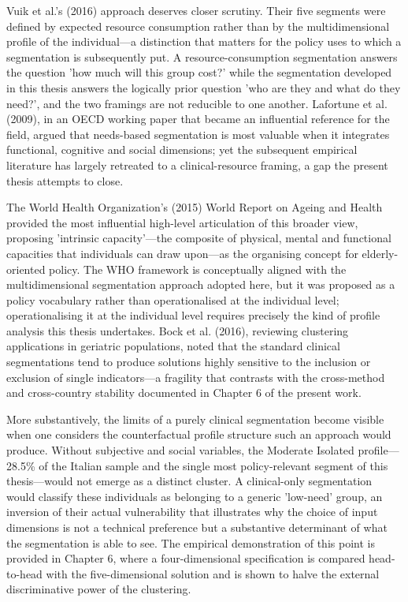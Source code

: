 Vuik et al.'s (2016) approach deserves closer scrutiny. Their five segments were defined by expected resource consumption rather than by the multidimensional profile of the individual---a distinction that matters for the policy uses to which a segmentation is subsequently put. A resource-consumption segmentation answers the question 'how much will this group cost?' while the segmentation developed in this thesis answers the logically prior question 'who are they and what do they need?', and the two framings are not reducible to one another. Lafortune et al. (2009), in an OECD working paper that became an influential reference for the field, argued that needs-based segmentation is most valuable when it integrates functional, cognitive and social dimensions; yet the subsequent empirical literature has largely retreated to a clinical-resource framing, a gap the present thesis attempts to close.

The World Health Organization's (2015) World Report on Ageing and Health provided the most influential high-level articulation of this broader view, proposing 'intrinsic capacity'---the composite of physical, mental and functional capacities that individuals can draw upon---as the organising concept for elderly-oriented policy. The WHO framework is conceptually aligned with the multidimensional segmentation approach adopted here, but it was proposed as a policy vocabulary rather than operationalised at the individual level; operationalising it at the individual level requires precisely the kind of profile analysis this thesis undertakes. Bock et al. (2016), reviewing clustering applications in geriatric populations, noted that the standard clinical segmentations tend to produce solutions highly sensitive to the inclusion or exclusion of single indicators---a fragility that contrasts with the cross-method and cross-country stability documented in Chapter 6 of the present work.

More substantively, the limits of a purely clinical segmentation become visible when one considers the counterfactual profile structure such an approach would produce. Without subjective and social variables, the Moderate Isolated profile---28.5\% of the Italian sample and the single most policy-relevant segment of this thesis---would not emerge as a distinct cluster. A clinical-only segmentation would classify these individuals as belonging to a generic 'low-need' group, an inversion of their actual vulnerability that illustrates why the choice of input dimensions is not a technical preference but a substantive determinant of what the segmentation is able to see. The empirical demonstration of this point is provided in Chapter 6, where a four-dimensional specification is compared head-to-head with the five-dimensional solution and is shown to halve the external discriminative power of the clustering.

